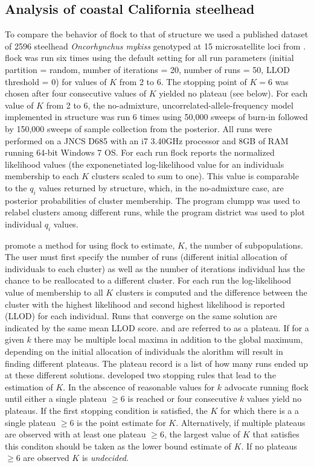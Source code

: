 \subsection*{Analysis of coastal California steelhead} 
To compare the behavior of {\sc flock} to that of {\sc structure} we used a published 
dataset of 2596 steelhead \textit{Oncorhynchus mykiss}
genotyped at 15 microsatellite loci from \citet{Garzaetal_norcal}.  {\sc flock} was run six times using the default setting for all 
run parameters (initial partition = random, number of iterations = 20, number of runs = 50, 
LLOD threshold = 0) for values of $K$ from 2 to 6. The stopping point of 
$K=6$ was chosen after four consecutive values of $K$
yielded no plateau (see below). For each value of $K$ from 2 to 6, the no-admixture, 
uncorrelated-allele-frequency model implemented in {\sc structure} was run 6 times using 
50,000 sweeps of burn-in followed by 150,000 sweeps of sample collection from the posterior. 
All runs were performed on a JNCS D685 with an i7 3.40GHz processor and 8GB
of RAM running 64-bit Windows 7 OS. For each run {\sc flock} reports the 
normalized likelihood values (the exponenetiated log-likelihood value for an individuals 
membership to each $K$ clusters scaled to sum to one). 
This value is comparable to the $q_i$ values
returned by {\sc structure}, which, in the no-admixture case, are posterior probabilities of cluster membership.
The program {\sc clumpp} \citep{Jak&Ros2007} was used to relabel clusters among different runs,
while the program {\sc district} \citep{Rosenberg2004} was used to plot individual \textit{$q_i$} values. 

\citet{Duc&Tur2012} promote a method for using {\sc flock} to estimate, $K$, the number of
subpopulations. The user must first specify the number of runs (different initial allocation of individuals 
to each cluster) as well as the number of iterations individual has the chance to be reallocated 
to a different cluster. For each run the log-likelihood value of membership to all $K$ clusters is computed
and the difference between the cluster with the highest likelihood and second highest likelihood is reported (LLOD)
for each individual. Runs that converge on the same solution are indicated by the same mean LLOD score. and 
are referred to as a plateau. If for a given $k$ there may be multiple local maxima in addition to 
the global maximum, depending on the initial allocation of individuals the alorithm will result in finding
different plateaus. The plateau record is a list of how many runs ended up at these different solutions. 
\citet{Duc&Tur2012} developed two stopping rules that lead to the estimation of $K$. In the abscence of 
reasonable values for $k$ \citet{Duc&Tur2012} advocate running  {\sc flock} until either a single plateau 
$\geq 6$  is reached or four consecutive $k$ values yield no plateaus. If the first stopping condition is satisfied,
the $K$ for which there is a a single plateau $\geq 6$ is the point estimate for $K$. Alternatively, 
if multiple plateaus are observed with at least one plateau $\geq 6$, the largest value of $K$ that satisfies 
this conditon should be taken as the lower bound estimate of $K$. If no plateaus $\geq 6$ are observed $K$
is \textit{undecided}.  

